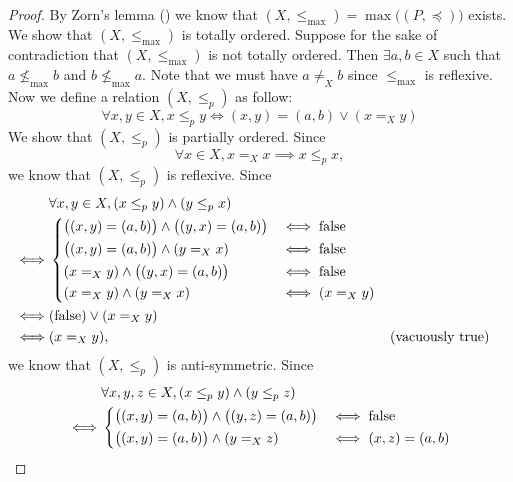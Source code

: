\begin{proof}
  By Zorn's lemma () we know that \((X, \leq_{\max}) = \max\big((P, \preceq)\big)\) exists.
  We show that \((X, \leq_{\max})\) is totally ordered.
  Suppose for the sake of contradiction that \((X, \leq_{\max})\) is not totally ordered.
  Then \(\exists a, b \in X\) such that \(a \not\leq_{\max} b\) and \(b \not\leq_{\max} a\).
  Note that we must have \(a \neq_X b\) since \(\leq_{\max}\) is reflexive.
  Now we define a relation \((X, \leq_p)\) as follow:
  \[
    \forall x, y \in X, x \leq_p y \iff (x, y) = (a, b) \lor (x =_X y)
  \]
  We show that \((X, \leq_p)\) is partially ordered.
  Since
  \[
    \forall x \in X, x =_X x \implies x \leq_p x,
  \]
  we know that \((X, \leq_p)\) is reflexive.
  Since
  \begin{align*}
         & \forall x, y \in X, (x \leq_p y) \land (y \leq_p x)                                                           \\
    \iff & \begin{dcases}
             \big((x, y) = (a, b)\big) \land \big((y, x) = (a, b)\big) & \iff \text{false} \\
             \big((x, y) = (a, b)\big) \land (y =_X x)                 & \iff \text{false} \\
             (x =_X y) \land \big((y, x) = (a, b)\big)                 & \iff \text{false} \\
             (x =_X y) \land (y =_X x)                                 & \iff (x =_X y)
           \end{dcases}                                 \\
    \iff & (\text{false}) \lor (x =_X y)                                                                                 \\
    \iff & (x =_X y),                                                                       &  & \text{(vacuously true)}
  \end{align*}
  we know that \((X, \leq_p)\) is anti-symmetric.
  Since
  \begin{align*}
         & \forall x, y, z \in X, (x \leq_p y) \land (y \leq_p z)                                                           \\
    \iff & \begin{dcases}
             \big((x, y) = (a, b)\big) \land \big((y, z) = (a, b)\big) & \iff \text{false}    \\
             \big((x, y) = (a, b)\big) \land (y =_X z)                 & \iff (x, z) = (a, b) \\

\end{dcases}
\end{align*}
\end{proof}
